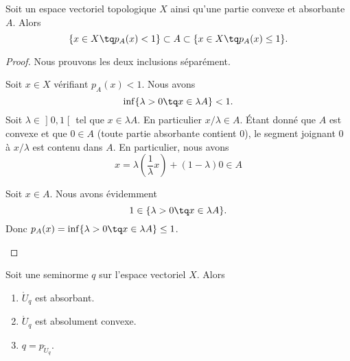 \begin{lemma}			\label{LEMooFUXVooJumScW}
	Soit un espace vectoriel topologique \( X\) ainsi qu'une partie convexe et absorbante \( A\). Alors
	\begin{equation}
		\{ x\in X\tq p_A(x)<1 \}\subset A\subset\{ x\in X\tq p_A(x)\leq 1 \}.
	\end{equation}
\end{lemma}

\begin{proof}
	Nous prouvons les deux inclusions séparément.
	\begin{subproof}
		Soit \( x\in X\) vérifiant \( p_A(x)<1\). Nous avons
		\begin{equation}
			\inf\{ \lambda>0\tq x\in \lambda A \}<1.
		\end{equation}
		Soit \( \lambda\in \mathopen] 0,1\mathclose[\) tel que \( x\in \lambda A\). En particulier \( x/\lambda\in A\). Étant donné que \( A\) est convexe et que \( 0\in A\) (toute partie absorbante contient \( 0\)), le segment joignant \( 0\) à \( x/\lambda\) est contenu dans \( A\). En particulier, nous avons
		\begin{equation}
			x=\lambda\left( \frac{ 1 }{ \lambda }x  \right)+(1-\lambda)0\in A
		\end{equation}

		Soit \( x\in A\). Nous avons évidemment
		\begin{equation}
			1\in\{ \lambda >0\tq x\in \lambda A \}.
		\end{equation}
		Donc \( p_A(x)=\inf\{ \lambda >0\tq x\in \lambda A \}\leq 1\).
	\end{subproof}
\end{proof}


\begin{lemma}		\label{LEMooFWCIooVwGutp}
	Soit une seminorme \( q\) sur l'espace vectoriel \( X\). Alors
	\begin{enumerate}
		\item
		      \( \mathring{U}_q\) est absorbant.
		\item
		      \( \mathring{U}_q\) est absolument convexe.
		\item
		      \( q=p_{\mathring{U}_q}\).
	\end{enumerate}
\end{lemma}

